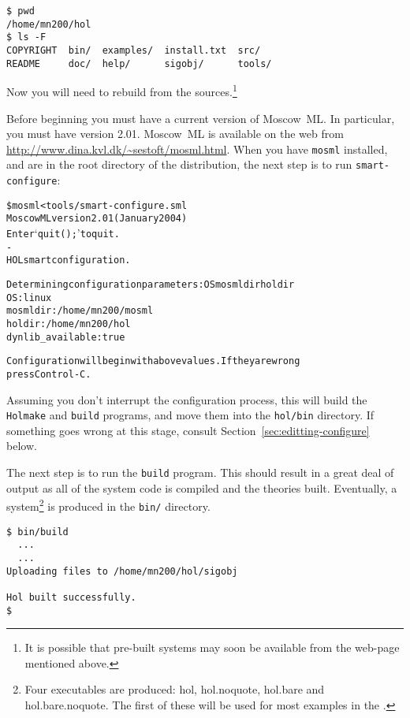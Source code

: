 \setcounter{sessioncount}{0}
\begin{session}
\begin{verbatim}
$ pwd
/home/mn200/hol
$ ls -F
COPYRIGHT  bin/  examples/  install.txt  src/
README     doc/  help/      sigobj/      tools/
\end{verbatim}
\end{session}

Now you will need to rebuild \HOL{} from the sources.\footnote{It is
  possible that pre-built systems may soon be available from the
  web-page mentioned above.}

Before beginning you must have a current version of Moscow~ML.  In
particular, you must have version 2.01.  Moscow~ML is available on the
web from \url{http://www.dina.kvl.dk/~sestoft/mosml.html}.
When you have \texttt{mosml} installed, and are in the root directory
of the distribution, the next step is to run \texttt{smart-configure}:

\begin{session}
\begin{alltt}
\$ mosml < tools/smart-configure.sml
Moscow ML version 2.01 (January 2004)
Enter `quit();' to quit.
-
HOL smart configuration.

Determining configuration parameters: OS mosmldir holdir
OS:                 linux
mosmldir:           /home/mn200/mosml
holdir:             /home/mn200/hol
dynlib_available:   true

Configuration will begin with above values.  If they are wrong
press Control-C.
\end{alltt}
\end{session}

Assuming you don't interrupt the configuration process, this will
build the \texttt{Holmake} and \texttt{build} programs, and move them
into the \texttt{hol/bin} directory.  If something goes wrong at this
stage, consult Section~\ref{sec:editting-configure} below.

The next step is to run the \texttt{build} program.  This should
result in a great deal of output as all of the system code is compiled
and the theories built.  Eventually, a \HOL{} system\footnote{Four
  \HOL{} executables are produced: \textsf{hol}, \textsf{hol.noquote},
  \textsf{hol.bare} and \textsf{hol.bare.noquote}.  The first of these
  will be used for most examples in the \TUTORIAL{}.} is produced in
the \texttt{bin/} directory.

\begin{session}
\begin{verbatim}
$ bin/build
  ...
  ...
Uploading files to /home/mn200/hol/sigobj

Hol built successfully.
$
\end{verbatim}
\end{session}


